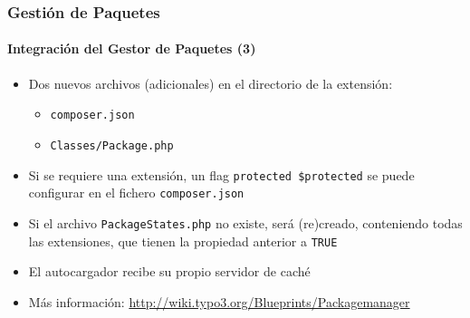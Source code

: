 
\begin{frame}[fragile]
	\frametitle{Gestión de Paquetes}
	\framesubtitle{Integración del Gestor de Paquetes (3)}

	\begin{itemize}

		\item Dos nuevos archivos (adicionales) en el directorio de la extensión:

			\begin{itemize}
				\item \texttt{composer.json}
				\item \texttt{Classes/Package.php}
			\end{itemize}

		\item Si se requiere una extensión, un flag \texttt{protected \$protected}\newline
			se puede configurar en el fichero \texttt{composer.json}

		\item Si el archivo \texttt{PackageStates.php} no existe, será (re)creado,\newline
			conteniendo todas las extensiones, que tienen la propiedad anterior a \texttt{TRUE}

		\item El autocargador recibe su propio servidor de caché

		\item Más información:\newline
			\url{http://wiki.typo3.org/Blueprints/Packagemanager}

	\end{itemize}

\end{frame}


